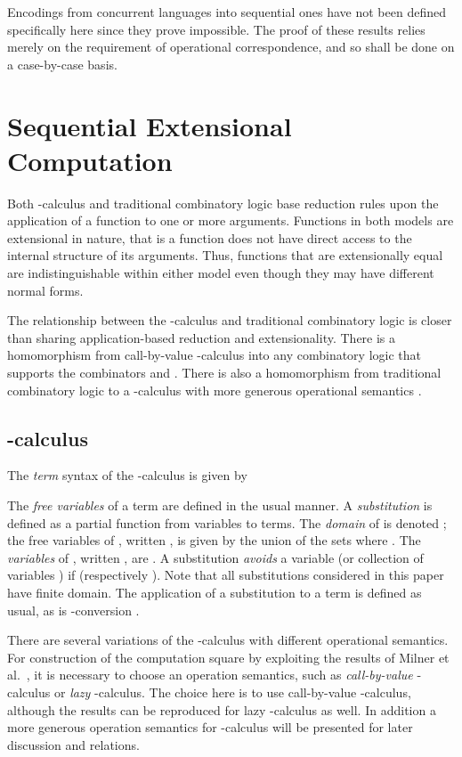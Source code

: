 \documentclass{llncs}
\begin{document}
Encodings from concurrent languages into sequential ones have not been defined specifically
here since they prove impossible. The proof of these results relies merely on the
requirement of operational correspondence, and so shall be
done on a case-by-case basis.

\section{Sequential Extensional Computation}
\label{sec:sec}

Both -calculus and traditional combinatory logic base reduction rules upon the application of a function to one or more arguments.
Functions in both models are extensional in nature, that is a function does not have direct access to the internal structure of its arguments.
Thus, functions that are extensionally equal are indistinguishable within either model even though they may have different normal forms.

The relationship between the -calculus and traditional combinatory logic is closer than sharing application-based reduction and extensionality.
There is a homomorphism from call-by-value -calculus into any combinatory logic that supports the combinators  and  \cite{Curry58combinatorylogic,Barendregt85}.
There is also a homomorphism from traditional combinatory logic to a -calculus with more generous operational semantics \cite{Curry58combinatorylogic,Barendregt85}.

\subsection{-calculus}
\label{ssec:lambda}

The {\em term} syntax of the -calculus is given by

The {\em free variables} of a term are defined in the usual manner.
A {\em substitution}  is defined as a partial function from variables to terms.
The {\em domain} of  is denoted ;
the free variables of , written , is given by the union of the sets  where .
The {\em variables} of , written , are .
A substitution  {\em avoids} a variable  (or collection of variables ) if  (respectively ).
Note that all substitutions considered in this paper have finite domain.
The application of a substitution  to a term  is defined as usual, as is -conversion .

There are several variations of the -calculus with different operational semantics.
For construction of the computation square by exploiting the results of Milner et al.~\cite{90426}, it is necessary to choose an operation semantics, such as {\em call-by-value} -calculus or {\em lazy} -calculus.
The choice here is to use call-by-value -calculus, although the results can be reproduced for lazy -calculus as well.
In addition a more generous operation semantics for -calculus will be presented for later discussion and relations.
\end{document}
